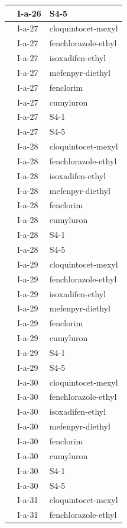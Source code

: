 \documentclass[11pt,a4paper]{article}
\begin{document}
\begin{table}[h]
\begin{tabular}{|l|l|l|}
 & I-a-26 & S4-5 \\ \hline
 & I-a-27 & cloquintocet-mexyl \\ \hline
 & I-a-27 & fenchlorazole-ethyl \\ \hline
 & I-a-27 & isoxadifen-ethyl \\ \hline
 & I-a-27 & mefenpyr-diethyl \\ \hline
 & I-a-27 & fenclorim \\ \hline
 & I-a-27 & cumyluron \\ \hline
 & I-a-27 & S4-1 \\ \hline
 & I-a-27 & S4-5 \\ \hline
 & I-a-28 & cloquintocet-mexyl \\ \hline
 & I-a-28 & fenchlorazole-ethyl \\ \hline
 & I-a-28 & isoxadifen-ethyl \\ \hline
 & I-a-28 & mefenpyr-diethyl \\ \hline
 & I-a-28 & fenclorim \\ \hline
 & I-a-28 & cumyluron \\ \hline
 & I-a-28 & S4-1 \\ \hline
 & I-a-28 & S4-5 \\ \hline
 & I-a-29 & cloquintocet-mexyl \\ \hline
 & I-a-29 & fenchlorazole-ethyl \\ \hline
 & I-a-29 & isoxadifen-ethyl \\ \hline
 & I-a-29 & mefenpyr-diethyl \\ \hline
 & I-a-29 & fenclorim \\ \hline
 & I-a-29 & cumyluron \\ \hline
 & I-a-29 & S4-1 \\ \hline
 & I-a-29 & S4-5 \\ \hline
 & I-a-30 & cloquintocet-mexyl \\ \hline
 & I-a-30 & fenchlorazole-ethyl \\ \hline
 & I-a-30 & isoxadifen-ethyl \\ \hline
 & I-a-30 & mefenpyr-diethyl \\ \hline
 & I-a-30 & fenclorim \\ \hline
 & I-a-30 & cumyluron \\ \hline
 & I-a-30 & S4-1 \\ \hline
 & I-a-30 & S4-5 \\ \hline
 & I-a-31 & cloquintocet-mexyl \\ \hline
 & I-a-31 & fenchlorazole-ethyl \\ \hline

\end{tabular}
\end{table}
\end{document}
